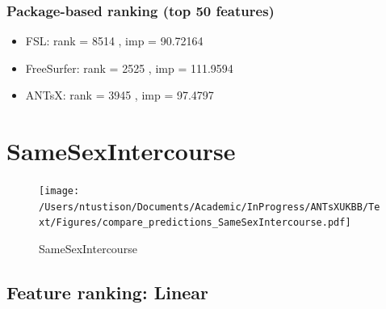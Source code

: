 \documentclass[
  10pt,
]{article}
\begin{document}
\hypertarget{package-based-ranking-top-50-features-8}{%
\subsubsection{Package-based ranking (top 50
features)}\label{package-based-ranking-top-50-features-8}}

\begin{itemize}
\item
  FSL: rank = 8514 , imp = 90.72164
\item
  FreeSurfer: rank = 2525 , imp = 111.9594
\item
  ANTsX: rank = 3945 , imp = 97.4797
\end{itemize}

\clearpage

\hypertarget{samesexintercourse}{%
\section{SameSexIntercourse}\label{samesexintercourse}}

\begin{figure}
\centering
\texttt{[image: /Users/ntustison/Documents/Academic/InProgress/ANTsXUKBB/Text/Figures/compare\_predictions\_SameSexIntercourse.pdf]}
\caption{SameSexIntercourse}
\end{figure}

\hypertarget{feature-ranking-linear-9}{%
\subsection{Feature ranking: Linear}\label{feature-ranking-linear-9}}
\end{document}
